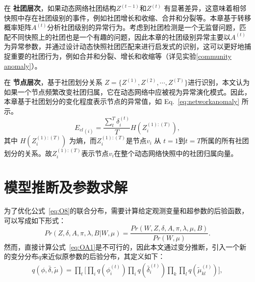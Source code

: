 在 \textbf{社团层次}，如果动态网络社团结构$Z^{(t-1)}$和$Z^{(t)}$ 有显著差异，这意味着相邻快照中存在社团级别的事件，例如社团增长和收缩、合并和分裂等。本章基于转移概率矩阵$A^{(t)}$分析社团级别的异常行为。考虑到社团检测是一个无监督问题，匹配不同快照上的社团也是一个有趣的问题，因此本章的社团级别异常主要以$A^{(t)}$为异常参数，并通过设计动态快照社团匹配来进行启发式的识别，这可以更好地捕捉重要的社团行为，例如合并和分裂、增长和收缩等（详见实验\ref{community anomaly}）。

在 \textbf{节点层次}，基于社团划分关系 $Z = \{ Z^{(1)}, Z^{(2)}, \cdots, Z^{(T)} \}$进行识别，本文认为如果一个节点频繁改变社团归属，它在动态网络中应被视为异常演化模式。因此，本章基于社团划分的变化程度表示节点的异常值，如 Eq.~\ref{eq:networkanomaly} 所示。
\begin{equation}
    {E_{cl}}_{(i)} = \frac{\sum_t^T \delta_i^{(t)}}{T} H(Z_i^{(1):(T)}),
\label{eq:networkanomaly}
\end{equation}
其中 $H(Z_i^{(1):(T)})$ 为熵，而$Z_i^{(1):(T)}$是节点$v_i$ 从 $t=1$到$t=T$所属的所有社团划分的关系。故$Z_i^{(1):(T)}$表示节点$v_i$在整个动态网络快照中的社团归属向量。


\section{模型推断及参数求解}
\label{sec4:inference}
为了优化公式~\ref{eq:O8}的联合分布，需要计算给定观测变量和超参数的后验函数，可以写成如下形式：
\begin{equation}
Pr(Z,\delta, A, \pi, \lambda, B | W, \mu) =
\frac{Pr(W, Z,\delta, A, \pi, \lambda, \mu, B)}{Pr( W, \mu)}.
\label{eq:OA1}
\end{equation}
然而，直接计算公式~\ref{eq:OA1}是不可行的，因此本文通过变分推断，引入一个新的变分分布$q$来近似原参数的后验分布，其定义如下：
\begin{equation}
\begin{split}
q(\phi,\bar{\delta}, \tilde{\mu}) = \prod_t \Big[ \prod_i q(\phi_i^{(t)}) \prod_i q(\bar{\delta}_i^{(t)}) \prod_k \prod_l q(\tilde{\mu}_{kl}^{(t)}) \Big],
\end{split}
\label{qfunc}
\end{equation}

